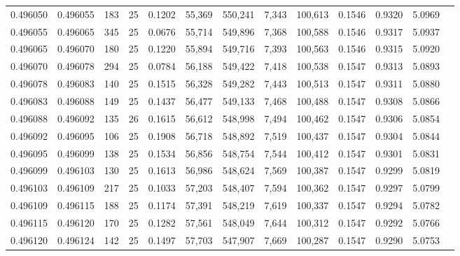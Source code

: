 \begin{tabular}{rrrrrrrrrrrrr}
0.496050 & 0.496055 & 183 &  25 &                                     0.1202 &  55,369 & 550,241 &   7,343 & 100,613 & 0.1546 & 0.9320 & 5.0969 \\
0.496055 & 0.496065 & 345 &  25 &                                     0.0676 &  55,714 & 549,896 &   7,368 & 100,588 & 0.1546 & 0.9317 & 5.0937 \\
0.496065 & 0.496070 & 180 &  25 &                                     0.1220 &  55,894 & 549,716 &   7,393 & 100,563 & 0.1546 & 0.9315 & 5.0920 \\
0.496070 & 0.496078 & 294 &  25 &                                     0.0784 &  56,188 & 549,422 &   7,418 & 100,538 & 0.1547 & 0.9313 & 5.0893 \\
0.496078 & 0.496083 & 140 &  25 &                                     0.1515 &  56,328 & 549,282 &   7,443 & 100,513 & 0.1547 & 0.9311 & 5.0880 \\
0.496083 & 0.496088 & 149 &  25 &                                     0.1437 &  56,477 & 549,133 &   7,468 & 100,488 & 0.1547 & 0.9308 & 5.0866 \\
0.496088 & 0.496092 & 135 &  26 &                                     0.1615 &  56,612 & 548,998 &   7,494 & 100,462 & 0.1547 & 0.9306 & 5.0854 \\
0.496092 & 0.496095 & 106 &  25 &                                     0.1908 &  56,718 & 548,892 &   7,519 & 100,437 & 0.1547 & 0.9304 & 5.0844 \\
0.496095 & 0.496099 & 138 &  25 &                                     0.1534 &  56,856 & 548,754 &   7,544 & 100,412 & 0.1547 & 0.9301 & 5.0831 \\
0.496099 & 0.496103 & 130 &  25 &                                     0.1613 &  56,986 & 548,624 &   7,569 & 100,387 & 0.1547 & 0.9299 & 5.0819 \\
0.496103 & 0.496109 & 217 &  25 &                                     0.1033 &  57,203 & 548,407 &   7,594 & 100,362 & 0.1547 & 0.9297 & 5.0799 \\
0.496109 & 0.496115 & 188 &  25 &                                     0.1174 &  57,391 & 548,219 &   7,619 & 100,337 & 0.1547 & 0.9294 & 5.0782 \\
0.496115 & 0.496120 & 170 &  25 &                                     0.1282 &  57,561 & 548,049 &   7,644 & 100,312 & 0.1547 & 0.9292 & 5.0766 \\
0.496120 & 0.496124 & 142 &  25 &                                     0.1497 &  57,703 & 547,907 &   7,669 & 100,287 & 0.1547 & 0.9290 & 5.0753 \\

\end{tabular}
